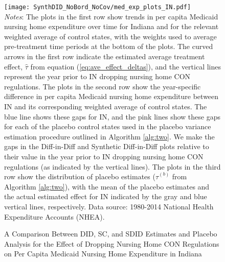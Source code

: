 \documentclass[../Main.tex]{subfiles}
\begin{document}
\newpage
{}
\begin{figure}[t] 
    \setlength{}
	\caption{\label{fig:med_exp_plots_in} \centering A Comparison Between DID, SC, and SDID Estimates and Placebo Analysis for the Effect of Dropping Nursing Home CON Regulations on Per Capita Medicaid Nursing Home Expenditure in Indiana} {\centering\texttt{[image: SynthDID\_NoBord\_NoCov/med\_exp\_plots\_IN.pdf]}}
    \vspace{-1.4cm}\\
    \scriptsize
		\textit{Notes}: The plots in the first row show trends in per capita Medicaid nursing home expenditure over time for Indiana and for the relevant weighted average of control states, with the weights used to average pre-treatment time periods at the bottom of the plots. The curved arrows in the first row indicate the estimated average treatment effect, $\hat{\tau}$ from equation (\ref{eq:ave_effect_deltas}), and the vertical lines represent the year prior to IN dropping nursing home CON regulations. The plots in the second row show the year-specific difference in per capita Medicaid nursing home expenditure between IN and its corresponding weighted average of control states. The blue line shows these gaps for IN, and the pink lines show these gaps for each of the placebo control states used in the placebo variance estimation procedure outlined in Algorithm \ref{alg:two}. We make the gaps in the Diff-in-Diff and Synthetic Diff-in-Diff plots relative to their value in the year prior to IN dropping nursing home CON regulations (as indicated by the vertical lines). The plots in the third row show the distribution of placebo estimates ($\hat{\tau}^{(b)}$ from Algorithm \ref{alg:two}), with the mean of the placebo estimates and the actual estimated effect for IN indicated by the gray and blue vertical lines, respectively. Data source: 1980-2014 National Health Expenditure Accounts (NHEA).
\end{figure}
\restoregeometry
\clearpage
\end{document}
